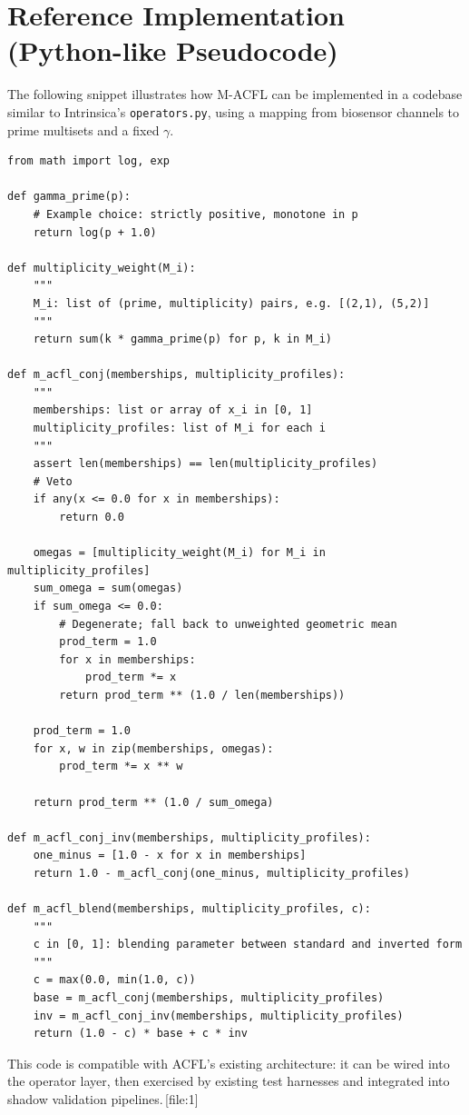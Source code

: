 \documentclass[11pt]{article}
\begin{document}
\section{Reference Implementation (Python-like Pseudocode)}

The following snippet illustrates how M-ACFL can be implemented in a codebase similar to Intrinsica's \texttt{operators.py}, using a mapping from biosensor channels to prime multisets and a fixed $\gamma$.

\begin{verbatim}
from math import log, exp

def gamma_prime(p):
    # Example choice: strictly positive, monotone in p
    return log(p + 1.0)

def multiplicity_weight(M_i):
    """
    M_i: list of (prime, multiplicity) pairs, e.g. [(2,1), (5,2)]
    """
    return sum(k * gamma_prime(p) for p, k in M_i)

def m_acfl_conj(memberships, multiplicity_profiles):
    """
    memberships: list or array of x_i in [0, 1]
    multiplicity_profiles: list of M_i for each i
    """
    assert len(memberships) == len(multiplicity_profiles)
    # Veto
    if any(x <= 0.0 for x in memberships):
        return 0.0

    omegas = [multiplicity_weight(M_i) for M_i in multiplicity_profiles]
    sum_omega = sum(omegas)
    if sum_omega <= 0.0:
        # Degenerate; fall back to unweighted geometric mean
        prod_term = 1.0
        for x in memberships:
            prod_term *= x
        return prod_term ** (1.0 / len(memberships))

    prod_term = 1.0
    for x, w in zip(memberships, omegas):
        prod_term *= x ** w

    return prod_term ** (1.0 / sum_omega)

def m_acfl_conj_inv(memberships, multiplicity_profiles):
    one_minus = [1.0 - x for x in memberships]
    return 1.0 - m_acfl_conj(one_minus, multiplicity_profiles)

def m_acfl_blend(memberships, multiplicity_profiles, c):
    """
    c in [0, 1]: blending parameter between standard and inverted form
    """
    c = max(0.0, min(1.0, c))
    base = m_acfl_conj(memberships, multiplicity_profiles)
    inv = m_acfl_conj_inv(memberships, multiplicity_profiles)
    return (1.0 - c) * base + c * inv
\end{verbatim}

This code is compatible with ACFL's existing architecture: it can be wired into the operator layer, then exercised by existing test harnesses and integrated into shadow validation pipelines.\,[file:1] 
\end{document}
